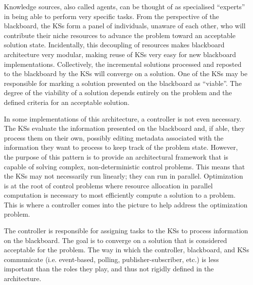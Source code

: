 Knowledge sources, also called agents, can be thought of as specialised
“experts” in being able to perform very specific tasks. From the perspective of
the blackboard, the KSs form a panel of individuals, unaware of each other, who
will contribute their niche resources to advance the problem toward an
acceptable solution state. Incidentally, this decoupling of resources makes
blackboard architecture very modular, making reuse of KSs very easy for new
blackboard implementations. Collectively, the incremental solutions processed
and reposted to the blackboard by the KSs will converge on a solution. One of
the KSs may be responsible for marking a solution presented on the blackboard
as “viable”. The degree of the viability of a solution depends entirely on the
problem and the defined criteria for an acceptable solution.

In some implementations of this architecture, a controller is not even
necessary. The KSs evaluate the information presented on the blackboard and, if
able, they process them on their own, possibly editing metadata associated with
the information they want to process to keep track of the problem state.
However, the purpose of this pattern is to provide an architectural framework
that is capable of solving complex, non-deterministic control problems. This
means that the KSs may not necessarily run linearly; they can run in parallel.
Optimization is at the root of control problems where resource allocation in
parallel computation is necessary to most efficiently compute a solution to a
problem. This is where a controller comes into the picture to help address the
optimization problem.

The controller is responsible for assigning tasks to the KSs to process
information on the blackboard. The goal is to converge on a solution that is
considered acceptable for the problem. The way in which the controller,
blackboard, and KSs communicate (i.e. event-based, polling,
publisher-subscriber, etc.) is less important than the roles they play, and
thus not rigidly defined in the architecture.




